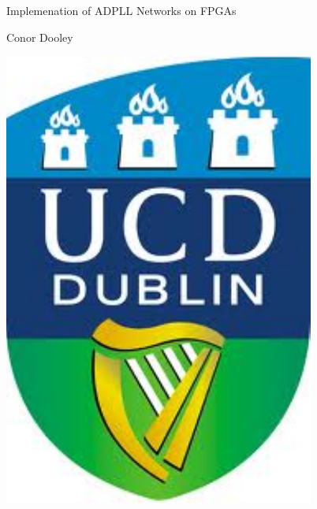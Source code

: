 \documentclass[11pt,english,british]{report}
\begin{document}
\begin{titlepage}



\begin{spacing}{3}

\noindent \begin{center}

{\huge{}Implemenation of ADPLL Networks on FPGAs}
\par\end{center}{\huge \par}
\end{spacing}

\bigskip{}

\begin{center}
{\Large{}Conor Dooley}
\end{center}

\vspace{1.25cm}

\begin{center}
\includegraphics[width=0.2\paperwidth]{UCD_crest.pdf}\vspace{0.25cm}
\end{center}



\end{titlepage}
\end{document}
